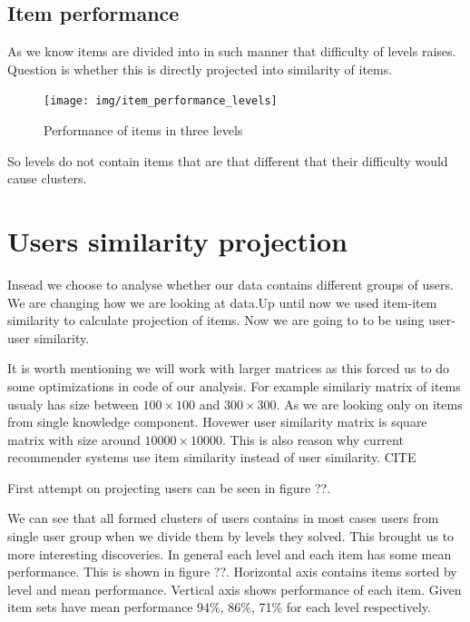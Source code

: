 \documentclass[
  digital, %
  table,   %
  nolof,     %
  nolot,     %
  nocover
]{fithesis3}
\begin{document}
\subsection{Item performance}

As we know items are divided into in such manner that difficulty of levels raises. Question is whether this is directly projected into similarity of items.

\begin{figure}
  \texttt{[image: img/item\_performance\_levels]}
  \caption{Performance of items in three levels}
  \label{fig:item_performance_levels}
\end{figure}

So levels do not contain items that are that different that their difficulty would cause clusters.



















\section{Users similarity
projection}\label{users-similarity-projection}

Insead we choose to analyse whether our data contains different groups
of users. We are changing how we are looking at data.Up until now we
used item-item similarity to calculate projection of items. Now we are
going to to be using user-user similarity.

It is worth mentioning we will work with larger matrices as this forced
us to do some optimizations in code of our analysis. For example
similariy matrix of items usualy has size between $100\times 100$ and
$300\times 300$. As we are looking only on items from single knowledge
component. Hovewer user similarity matrix is square matrix with size
around $10 000\times 10 000$. This is also reason why current
recommender systems use item similarity instead of user similarity. CITE

First attempt on projecting users can be seen in figure ??.


We can see that all formed clusters of users contains in most cases users
from single user group when we divide them by levels they solved. This
brought us to more interesting discoveries. In general each level and
each item has some mean performance. This is shown in figure ??.
Horizontal axis contains items sorted by level and mean performance.
Vertical axis shows performance of each item. Given item sets have mean
performance 94\%, 86\%, 71\% for each level respectively.
\end{document}
